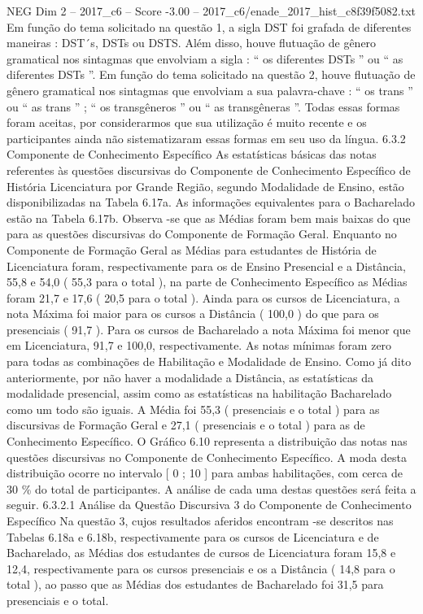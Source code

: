 \begin{textsample}{NEG Dim 2 – 2017\_c6 – Score -3.00 – 2017\_c6/enade\_2017\_hist\_c8f39f5082.txt}
Em função do tema solicitado na questão 1, a sigla DST foi grafada de diferentes maneiras : DST´s, DSTs ou DSTS.
Além disso, houve flutuação de gênero gramatical nos sintagmas que envolviam a sigla : “ os diferentes DSTs ” ou “ as diferentes DSTs ”.
Em função do tema solicitado na questão 2, houve flutuação de gênero gramatical nos sintagmas que envolviam a sua palavra-chave : “ os trans ” ou “ as trans ” ; “ os transgêneros ” ou “ as transgêneras ”.
Todas essas formas foram aceitas, por considerarmos que sua utilização é muito recente e os participantes ainda não sistematizaram essas formas em seu uso da língua. 6.3.2 Componente de Conhecimento Específico As estatísticas básicas das notas referentes às questões discursivas do Componente de Conhecimento Específico de História Licenciatura por Grande Região, segundo Modalidade de Ensino, estão disponibilizadas na Tabela 6.17a.
As informações equivalentes para o Bacharelado estão na Tabela 6.17b.
Observa -se que as Médias foram bem mais baixas do que para as questões discursivas do Componente de Formação Geral.
Enquanto no Componente de Formação Geral as Médias para estudantes de História de Licenciatura foram, respectivamente para os de Ensino Presencial e a Distância, 55,8 e 54,0 ( 55,3 para o total ), na parte de Conhecimento Específico as Médias foram 21,7 e 17,6 ( 20,5 para o total ).
Ainda para os cursos de Licenciatura, a nota Máxima foi maior para os cursos a Distância ( 100,0 ) do que para os presenciais ( 91,7 ).
Para os cursos de Bacharelado a nota Máxima foi menor que em Licenciatura, 91,7 e 100,0, respectivamente.
As notas mínimas foram zero para todas as combinações de Habilitação e Modalidade de Ensino.
Como já dito anteriormente, por não haver a modalidade a Distância, as estatísticas da modalidade presencial, assim como as estatísticas na habilitação Bacharelado como um todo são iguais.
A Média foi 55,3 ( presenciais e o total ) para as discursivas de Formação Geral e 27,1 ( presenciais e o total ) para as de Conhecimento Específico.
O Gráfico 6.10 representa a distribuição das notas nas questões discursivas no Componente de Conhecimento Específico.
A moda desta distribuição ocorre no intervalo [ 0 ; 10 ] para ambas habilitações, com cerca de 30 \% do total de participantes.
A análise de cada uma destas questões será feita a seguir. 6.3.2.1 Análise da Questão Discursiva 3 do Componente de Conhecimento Específico Na questão 3, cujos resultados aferidos encontram -se descritos nas Tabelas 6.18a e 6.18b, respectivamente para os cursos de Licenciatura e de Bacharelado, as Médias dos estudantes de cursos de Licenciatura foram 15,8 e 12,4, respectivamente para os cursos presenciais e os a Distância ( 14,8 para o total ), ao passo que as Médias dos estudantes de Bacharelado foi 31,5 para presenciais e o total.

\end{textsample}
